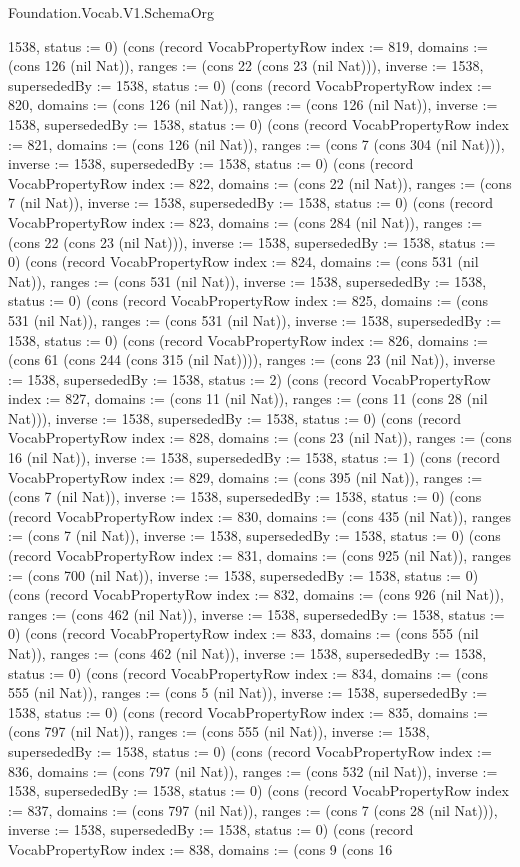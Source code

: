 \begin{lexlean}{Foundation.Vocab.V1.SchemaOrg}
\begin{semanticmodule}
{1538, status := 0}) (cons (record VocabPropertyRow {index := 819, domains := (cons 126 (nil Nat)), ranges := (cons 22 (cons 23 (nil Nat))), inverse := 1538, supersededBy := 1538, status := 0}) (cons (record VocabPropertyRow {index := 820, domains := (cons 126 (nil Nat)), ranges := (cons 126 (nil Nat)), inverse := 1538, supersededBy := 1538, status := 0}) (cons (record VocabPropertyRow {index := 821, domains := (cons 126 (nil Nat)), ranges := (cons 7 (cons 304 (nil Nat))), inverse := 1538, supersededBy := 1538, status := 0}) (cons (record VocabPropertyRow {index := 822, domains := (cons 22 (nil Nat)), ranges := (cons 7 (nil Nat)), inverse := 1538, supersededBy := 1538, status := 0}) (cons (record VocabPropertyRow {index := 823, domains := (cons 284 (nil Nat)), ranges := (cons 22 (cons 23 (nil Nat))), inverse := 1538, supersededBy := 1538, status := 0}) (cons (record VocabPropertyRow {index := 824, domains := (cons 531 (nil Nat)), ranges := (cons 531 (nil Nat)), inverse := 1538, supersededBy := 1538, status := 0}) (cons (record VocabPropertyRow {index := 825, domains := (cons 531 (nil Nat)), ranges := (cons 531 (nil Nat)), inverse := 1538, supersededBy := 1538, status := 0}) (cons (record VocabPropertyRow {index := 826, domains := (cons 61 (cons 244 (cons 315 (nil Nat)))), ranges := (cons 23 (nil Nat)), inverse := 1538, supersededBy := 1538, status := 2}) (cons (record VocabPropertyRow {index := 827, domains := (cons 11 (nil Nat)), ranges := (cons 11 (cons 28 (nil Nat))), inverse := 1538, supersededBy := 1538, status := 0}) (cons (record VocabPropertyRow {index := 828, domains := (cons 23 (nil Nat)), ranges := (cons 16 (nil Nat)), inverse := 1538, supersededBy := 1538, status := 1}) (cons (record VocabPropertyRow {index := 829, domains := (cons 395 (nil Nat)), ranges := (cons 7 (nil Nat)), inverse := 1538, supersededBy := 1538, status := 0}) (cons (record VocabPropertyRow {index := 830, domains := (cons 435 (nil Nat)), ranges := (cons 7 (nil Nat)), inverse := 1538, supersededBy := 1538, status := 0}) (cons (record VocabPropertyRow {index := 831, domains := (cons 925 (nil Nat)), ranges := (cons 700 (nil Nat)), inverse := 1538, supersededBy := 1538, status := 0}) (cons (record VocabPropertyRow {index := 832, domains := (cons 926 (nil Nat)), ranges := (cons 462 (nil Nat)), inverse := 1538, supersededBy := 1538, status := 0}) (cons (record VocabPropertyRow {index := 833, domains := (cons 555 (nil Nat)), ranges := (cons 462 (nil Nat)), inverse := 1538, supersededBy := 1538, status := 0}) (cons (record VocabPropertyRow {index := 834, domains := (cons 555 (nil Nat)), ranges := (cons 5 (nil Nat)), inverse := 1538, supersededBy := 1538, status := 0}) (cons (record VocabPropertyRow {index := 835, domains := (cons 797 (nil Nat)), ranges := (cons 555 (nil Nat)), inverse := 1538, supersededBy := 1538, status := 0}) (cons (record VocabPropertyRow {index := 836, domains := (cons 797 (nil Nat)), ranges := (cons 532 (nil Nat)), inverse := 1538, supersededBy := 1538, status := 0}) (cons (record VocabPropertyRow {index := 837, domains := (cons 797 (nil Nat)), ranges := (cons 7 (cons 28 (nil Nat))), inverse := 1538, supersededBy := 1538, status := 0}) (cons (record VocabPropertyRow {index := 838, domains := (cons 9 (cons 16 }
\end{semanticmodule}
\end{lexlean}
